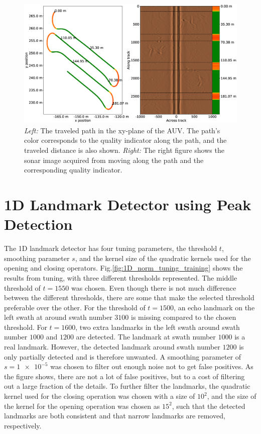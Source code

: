 \begin{figure} %
  \centering
  \includegraphics[width=1.0\textwidth]{figures/path_and_quality_indicator.eps}
  \caption[Path with quality indicator overlayed]{\textit{Left:} The traveled path in the xy-plane of the AUV. The path's color corresponds to the quality indicator along the path, and the traveled distance is also shown. \textit{Right:} The right figure shows the sonar image acquired from moving along the path and the corresponding quality indicator.}
  \label{fig:path_and_quality_ind}
\end{figure}

\section{1D Landmark Detector using Peak Detection}

The 1D landmark detector has four tuning parameters, the threshold $t$, smoothing parameter $s$, and the kernel size of the quadratic kernels used for the opening and closing operators. Fig.\ref{fig:1D_norm_tuning_training} shows the results from tuning, with three different thresholds represented. The middle threshold of $t = 1550$ was chosen. Even though there is not much difference between the different thresholds, there are some that make the selected threshold preferable over the other. For the threshold of $t = 1500$, an echo landmark on the left swath at around swath number $3100$ is missing compared to the chosen threshold. For $t = 1600$, two extra landmarks in the left swath around swath number $1000$ and $1200$ are detected. The landmark at swath number $1000$ is a real landmark. However, the detected landmark around swath number $1200$ is only partially detected and is therefore unwanted. A smoothing parameter of $s = \num{1e-5}$ was chosen to filter out enough noise not to get false positives. As the figure shows, there are not a lot of false positives, but to a cost of filtering out a large fraction of the details. To further filter the landmarks, the quadratic kernel used for the closing operation was chosen with a size of $10^2$, and the size of the kernel for the opening operation was chosen as $15^2$, such that the detected landmarks are both consistent and that narrow landmarks are removed, respectively.  

